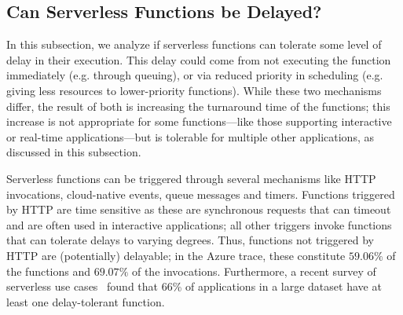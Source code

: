 \subsection{Can Serverless Functions be Delayed?}
\label{sec:motivation:delay-tolerant}
In this subsection, we analyze if serverless functions can tolerate some level of delay in their execution. 
This delay could come from not executing the function immediately (e.g. through queuing), or via reduced priority in scheduling (e.g. giving less resources to lower-priority functions).
While these two mechanisms differ, the result of both is increasing the turnaround time of the functions; this increase is not appropriate for some functions---like those supporting interactive or real-time applications---but is tolerable for multiple other applications, as discussed in this subsection.

Serverless functions can be triggered through several mechanisms like HTTP invocations, cloud-native events, queue messages and timers.
Functions triggered by HTTP are time sensitive as these are synchronous requests that can timeout and are often used in interactive applications;
all other triggers invoke functions that can tolerate delays to varying degrees.
Thus, functions not triggered by HTTP are (potentially) delayable; in the Azure trace, these constitute $59.06\%$ of the functions and $69.07\%$ of the invocations.
Furthermore, a recent survey of serverless use cases~\cite{Eismann:TSE:2021:CommunityConsensus} found that 66\% of applications in a large dataset have at least one delay-tolerant function.

